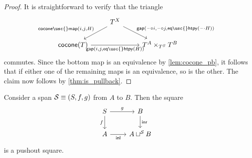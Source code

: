 \begin{proof}
It is straightforward to verify that the triangle
\begin{equation*}
\begin{tikzcd}
& T^X \arrow[dl,swap,"{\mathsf{cocone\usc{}map}(i,j,H)}"] \arrow[dr,"{\mathsf{gap}(\blank\circ i,\blank\circ j, \mathsf{eq\usc{}htpy}(\blank\cdot H))}"] \\
\mathsf{cocone}(T) \arrow[rr,swap,"{\mathsf{gap}(i,j,\mathsf{eq\usc{}htpy}(H))}"] & & T^A \times_{T^S} T^B
\end{tikzcd}
\end{equation*}
commutes. Since the bottom map is an equivalence by \cref{lem:cocone_pb}, it follows that if either one of the remaining maps is an equivalence, so is the other. The claim now follows by \cref{thm:is_pullback}.
\end{proof}

\begin{thm}\label{thm:pushout}
Consider a span $\mathcal{S}\equiv (S,f,g)$ from $A$ to $B$. Then the square
\begin{equation*}
\begin{tikzcd}
S \arrow[r,"g"] \arrow[d,swap,"f"] & B \arrow[d,"\inr"] \\
A \arrow[r,swap,"\inl"] & A \sqcup^{\mathcal{S}} B
\end{tikzcd}
\end{equation*}
is a pushout square.
\end{thm}

